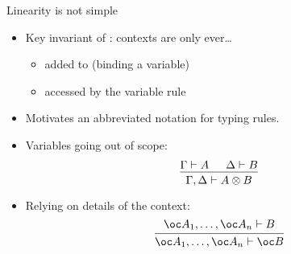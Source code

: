 \documentclass[fleqn]{beamer}
\begin{document}
\begin{frame}{Linearity is not simple}
  \begin{itemize}
    \item<1-> Key invariant of \cite{AACMM21}: contexts are only ever\ldots
      \begin{itemize}
        \item added to (binding a variable)
        \item accessed by the variable rule
      \end{itemize}
    \item<1-> Motivates an abbreviated notation for typing rules.
    \item<2-> Variables going out of scope:
      \[
        \begin{prooftree}
          \hypo{\Gamma \vdash A}
          \hypo{\Delta \vdash B}
          \infer2{\Gamma, \Delta \vdash A \otimes B}
        \end{prooftree}
      \]

    \item<3-> Relying on details of the context:~\cite{wadler91use}
      \[
      \begin{prooftree}
        \hypo{\oc A_1, \ldots, \oc A_n \vdash B}
        \infer1{\oc A_1, \ldots, \oc A_n \vdash \oc B}
      \end{prooftree}
      \]
  \end{itemize}
\end{frame}
\end{document}

